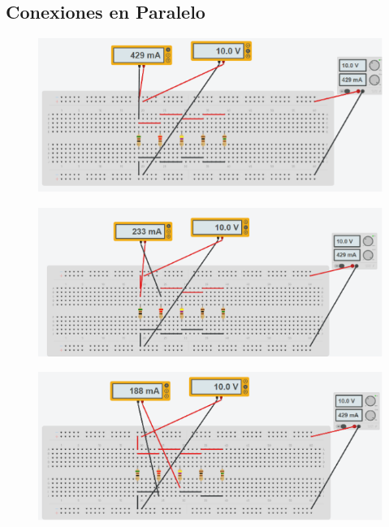 \subsection{Conexiones en Paralelo}
\begin{figure}[H]
    \centering
    \begin{minipage}{0.45\textwidth}
      \centering
      \includegraphics[width=\textwidth]{Figures/1. Content/simulation/paralelo.png}
      \label{fig: Simulacion Conexion Paralelo}
    \end{minipage}
    \hfill
    \begin{minipage}{0.45\textwidth}
      \centering
      \includegraphics[width=\textwidth]{Figures/1. Content/simulation/paraleloA.png}
      \label{fig: Simulacion Conexion Paralelo A}
    \end{minipage}
    \hfill
    \begin{minipage}{0.45\textwidth}
      \centering
      \includegraphics[width=\textwidth]{Figures/1. Content/simulation/paraleloB.png}

\end{minipage}
\end{figure}

